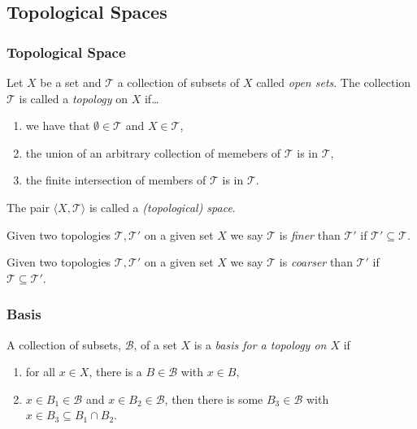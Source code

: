 \subsection{Topological Spaces}

\subsubsection{Topological Space}\label{topologicalspace}
Let $X$ be a set and $\mathcal{T}$ a collection of subsets of $X$ called \emph{open sets}\label{open}. The collection $\mathcal{T}$ is called a \emph{topology} on $X$ if\dots
\begin{enumerate}
  \item we have that $\emptyset \in \mathcal{T}$ and $X \in \mathcal{T}$,
  \item the union of an arbitrary collection of memebers of $\mathcal{T}$ is in $\mathcal{T}$,
  \item the finite intersection of members of $\mathcal{T}$ is in $\mathcal{T}$.
\end{enumerate}
The pair $\langle X, \mathcal{T} \rangle$ is called a \emph{(topological) space}.

\label{finer}

Given two topologies $\mathcal{T},\mathcal{T}'$ on a given set $X$ we say $\mathcal{T}$ is \emph{finer} than $\mathcal{T}'$ if $\mathcal{T}' \subseteq \mathcal{T}$.

\label{coaser}

Given two topologies $\mathcal{T},\mathcal{T}'$ on a given set $X$ we say $\mathcal{T}$ is \emph{coarser} than $\mathcal{T}'$ if $\mathcal{T} \subseteq \mathcal{T}'$.

\subsubsection{Basis}\label{basis}

A collection of subsets, $\mathcal{B}$, of a set $X$ is a \emph{basis for a topology on $X$} if
\begin{enumerate}
  \item for all $x \in X$, there is a $B \in \mathcal{B}$ with $x \in B$,
  \item $x \in B_1 \in \mathcal{B}$ and $x \in B_2 \in \mathcal{B}$, then there is some $B_3 \in \mathcal{B}$ with $x \in B_3 \subseteq B_1 \cap B_2$.
\end{enumerate}

